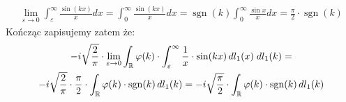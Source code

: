 \documentclass[11pt]{scrartcl}
\DeclareMathOperator{\sgn}{sgn}
\begin{document}
\begin{walk}
            \begin{gather*}
                \lim_{\varepsilon \to 0} \int_{\varepsilon}^{\infty } \frac{\sin (kx)}{x} dx = 
                \int_0^{\infty } \frac{\sin (kx)}{x} dx = \sgn (k) \int_0^{\infty } \frac{\sin x}{x} dx = 
                \frac{\pi }{2} \cdot \sgn (k)
            \end{gather*}
            Kończąc zapisujemy zatem że:
            \begin{gather*}
                   -i \sqrt{\frac{2}{\pi}} \cdot \lim_{\varepsilon \to 0} \int_{\RR} \varphi (k) \cdot 
                   \int_{\varepsilon}^{\infty } \frac{1}{x} \cdot \sin (kx) \, dl_1 (x) \; dl_1(k) = \\
                   -i \sqrt{\frac{2}{\pi}} \cdot \frac{\pi }{2} \cdot 
                       \int_{\RR} \varphi (k) \cdot \sgn (k) \, dl_1 (k) = 
                   -i \sqrt{\frac{\pi }{2}} \cdot \int_{\RR} \varphi (k) \cdot \sgn (k) \, dl_1 (k)
            \end{gather*}
        \end{walk}
 
\end{document}
